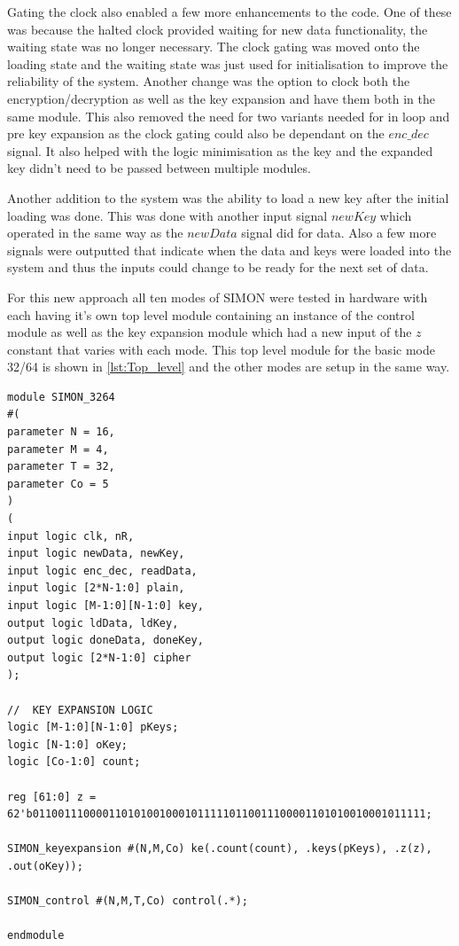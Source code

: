 \documentclass[12pt,twoside,a4paper]{report}
\begin{document}
	Gating the clock also enabled a few more enhancements to the code. One of these was because the halted clock provided waiting for new data functionality, the waiting state was no longer necessary. The clock gating was moved onto the loading state and the waiting state was just used for initialisation to improve the reliability of the system. Another change was the option to clock both the encryption/decryption as well as the key expansion and have them both in the same module. This also removed the need for two variants needed for in loop and pre key expansion as the clock gating could also be dependant on the $enc\_dec$ signal. It also helped with the logic minimisation as the key and the expanded key didn't need to be passed between multiple modules.
	
	Another addition to the system was the ability to load a new key after the initial loading was done. This was done with another input signal $newKey$ which operated in the same way as the $newData$ signal did for data. Also a few more signals were outputted that indicate when the data and keys were loaded into the system and thus the inputs could change to be ready for the next set of data.
	
	For this new approach all ten modes of SIMON were tested in hardware with each having it's own top level module containing an instance of the control module as well as the key expansion module which had a new input of the $z$ constant that varies with each mode. This top level module for the basic mode 32/64 is shown in \autoref{lst:Top_level} and the other modes are setup in the same way.

	\begin{minipage}{\linewidth}
	\begin{lstlisting}[label={lst:Top_level},caption={The next state logic for the ($PRE$) control module},style=SVStyle]
module SIMON_3264
#(
parameter N = 16,
parameter M = 4,
parameter T = 32,		
parameter Co = 5
)
(
input logic clk, nR,
input logic newData, newKey,
input logic enc_dec, readData,
input logic [2*N-1:0] plain,
input logic [M-1:0][N-1:0] key,
output logic ldData, ldKey,
output logic doneData, doneKey,
output logic [2*N-1:0] cipher
);

//	KEY EXPANSION LOGIC
logic [M-1:0][N-1:0] pKeys;
logic [N-1:0] oKey;
logic [Co-1:0] count;

reg [61:0] z = 62'b01100111000011010100100010111110110011100001101010010001011111;

SIMON_keyexpansion #(N,M,Co) ke(.count(count), .keys(pKeys), .z(z), .out(oKey));

SIMON_control #(N,M,T,Co) control(.*);

endmodule
	\end{lstlisting}
	\end{minipage}
\end{document}
